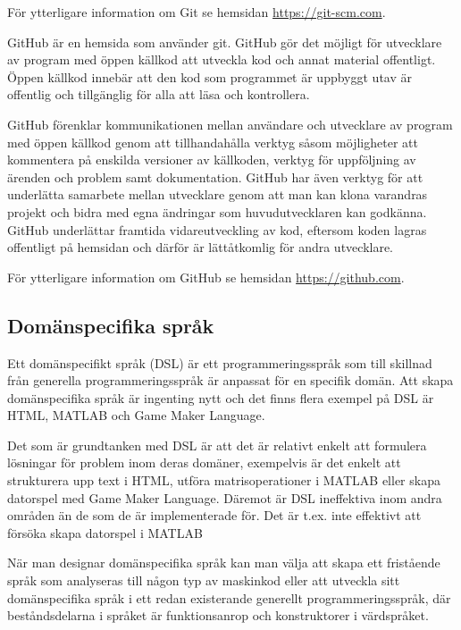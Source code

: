 \documentclass[]{article}
\begin{document}
För ytterligare information om Git se hemsidan \url{https://git-scm.com}.

GitHub är en hemsida som använder git. GitHub gör det möjligt för utvecklare av
program med öppen källkod att utveckla kod och annat material offentligt.
Öppen källkod innebär att den kod som programmet är uppbyggt utav är offentlig
och tillgänglig för alla att läsa och kontrollera.

GitHub förenklar kommunikationen mellan användare och utvecklare av program med
öppen källkod genom att tillhandahålla verktyg såsom möjligheter att kommentera
på enskilda versioner av källkoden, verktyg för uppföljning av ärenden och
problem samt dokumentation. GitHub har även verktyg för att underlätta samarbete
mellan utvecklare genom att man kan klona varandras projekt och bidra med egna
ändringar som huvudutvecklaren kan godkänna. GitHub underlättar framtida
vidareutveckling av kod, eftersom koden lagras offentligt på hemsidan och
därför är lättåtkomlig för andra utvecklare.

För ytterligare information om GitHub se hemsidan \url{https://github.com}.


\subsection{Domänspecifika språk}
Ett domänspecifikt språk (\gls{DSL}) är ett programmeringsspråk som till
skillnad från generella programmeringsspråk är anpassat för en
specifik domän. Att skapa domänspecifika språk är ingenting nytt och det
finns flera exempel på DSL är HTML, MATLAB och Game Maker Language.

Det som är grundtanken med DSL är att det är relativt enkelt att formulera lösningar
för problem inom deras domäner, exempelvis är det enkelt att strukturera upp text i
HTML, utföra matrisoperationer i MATLAB eller skapa datorspel med Game Maker Language.
Däremot är DSL ineffektiva inom andra områden än de som de är implementerade för.
Det är t.ex. inte effektivt att försöka skapa datorspel i MATLAB

När man designar domänspecifika språk kan man välja att skapa ett fristående
språk som analyseras till någon typ av maskinkod eller att utveckla sitt
domänspecifika språk i ett redan existerande generellt programmeringsspråk,
där beståndsdelarna i språket är funktionsanrop och konstruktorer i värdspråket.
\end{document}
